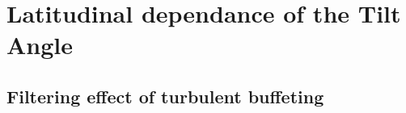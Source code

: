 \documentclass[namedreferences,hyperref,optionalrh]{spr-sola}
\newcommand{\mpc}[1]{{\bf \color{blue}{[Mariano comment: #1]}}}
\newcommand{\pc}[1]{{\color{ForestGreen}{P comment: #1}}}
\begin{document}
 

  
\section{Latitudinal dependance of the Tilt Angle} %
  \label{S-latitude}









  
 
 
%


  \subsection{Filtering effect of turbulent buffeting}
      \label{S-filter}

\mpc{Reducing outliers assuming a latitudinal dependence $\propto \sin (\theta)$}
\end{document}
